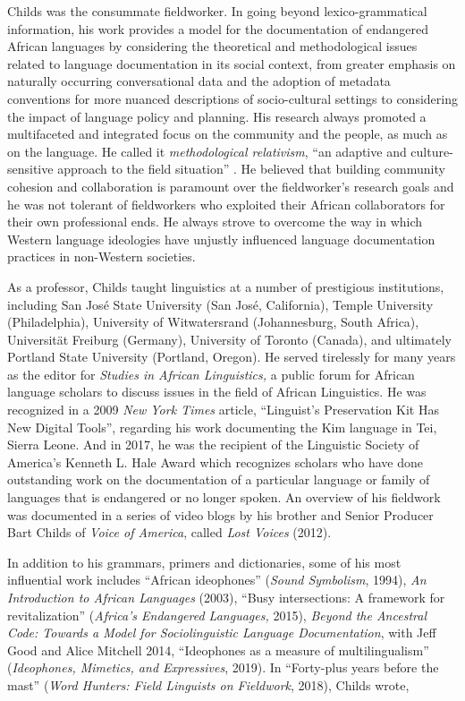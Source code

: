 Childs was the consummate fieldworker. In going beyond lexico-grammatical information, his work provides a model for the documentation of endangered African languages by considering the theoretical and methodological issues related to language documentation in its social context, from greater emphasis on naturally occurring conversational data and the adoption of metadata conventions for more nuanced descriptions of socio-cultural settings to considering the impact of language policy and planning. His research always promoted a multifaceted and integrated focus on the community and the people, as much as on the language. He called it \textit{methodological relativism}, “an adaptive and culture-sensitive approach to the field situation” \citep{Childs2016}. He believed that building community cohesion and collaboration is paramount over the fieldworker's research goals and he was not tolerant of fieldworkers who exploited their African collaborators for their own professional ends. He always strove to overcome the way in which Western language ideologies have unjustly influenced language documentation practices in non-Western societies.

As a professor, Childs taught linguistics at a number of prestigious institutions, including San José State University (San José, California), Temple University (Philadelphia), University of Witwatersrand (Johannesburg, South Africa), Universität Freiburg (Germany), University of Toronto (Canada), and ultimately Portland State University (Portland, Oregon). He served tirelessly for many years as the editor for \textit{Studies in African Linguistics,} a public forum for African language scholars to discuss issues in the field of African Linguistics. He was recognized in a 2009 \textit{New York Times} article, “Linguist's Preservation Kit Has New Digital Tools”, regarding his work documenting the Kim language in Tei, Sierra Leone. And in 2017, he was the recipient of the Linguistic Society of America's Kenneth L. Hale Award which recognizes scholars who have done outstanding work on the documentation of a particular language or family of languages that is endangered or no longer spoken. An overview of his fieldwork was documented in a series of video blogs by his brother and Senior Producer Bart Childs of \textit{Voice of America}, called \textit{Lost Voices} (2012).

In addition to his grammars, primers and dictionaries, some of his most influential work includes “African ideophones” (\textit{Sound Symbolism}, 1994), \textit{An Introduction to African Languages} (2003), “Busy intersections: A framework for revitalization” (\textit{Africa's Endangered Languages,} 2015), \textit{Beyond the Ancestral Code: Towards a Model for Sociolinguistic Language Documentation}, with Jeff Good and Alice  {Mitchell 2014}, “Ideophones as a measure of multilingualism” (\textit{Ideophones, Mimetics, and Expressives}, 2019). In “Forty-plus years before the mast” (\textit{Word Hunters: Field Linguists on Fieldwork}, 2018), Childs wrote,

